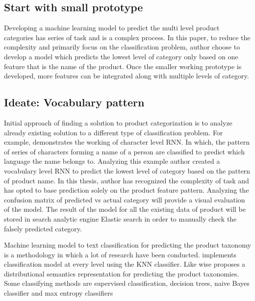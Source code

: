 \subsection{Start with small prototype}

Developing a machine learning model to predict the multi level product categories has series of task and is a complex process. In this paper, to reduce the complexity and primarily focus on the classification problem, author choose to develop a model which predicts the lowest level of category only based on one feature that is the name of the product. Once the smaller working prototype is developed, more features can be integrated along with multiple levels of category. 


\subsection{Ideate: Vocabulary pattern}
Initial approach of finding a solution to product categorization is to analyze already existing solution to a different type of classification problem. For example, \parencite{sean} demonstrates the working of character level RNN. In which, the pattern of series of characters forming a name of a person are classified to predict which language the name belongs to. Analyzing this example author created a vocabulary level RNN to predict the lowest level of category based on the pattern of product name. In this thesis, author has recognized the complexity of task and has opted to base prediction solely on the product feature pattern. Analyzing the confusion matrix of predicted vs actual category will provide a visual evaluation of the model. The result of the model for all the existing data of product will be stored in search analytic engine Elastic search in order to manually check the falsely predicted category.

Machine learning model to text classification for predicting the product taxonomy is a methodology in which a lot of research have been conducted. \cite{AliCevahir.} implements classification model at every level using the \acl*{KNN} classifier. Like wise \parencite{Gupta.20062016}  proposes a distributional semantics representation for predicting the product taxonomies.  Some classifying methods are supervised classification, decision trees, naive Bayes classifier and max entropy classifiers \parencite{BirdKleinLoper09}

